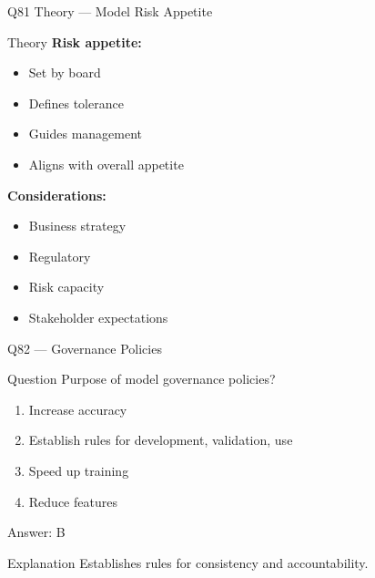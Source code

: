 \documentclass[aspectratio=169,8pt]{beamer}
\begin{document}
	\begin{frame}{Q81 Theory --- Model Risk Appetite}
		\begin{block}{Theory}
			\textbf{Risk appetite:}
			\begin{itemize}
				\item Set by board
				\item Defines tolerance
				\item Guides management
				\item Aligns with overall appetite
			\end{itemize}
			\textbf{Considerations:}
			\begin{itemize}
				\item Business strategy
				\item Regulatory
				\item Risk capacity
				\item Stakeholder expectations
			\end{itemize}
		\end{block}
	\end{frame}
	
	\begin{frame}{Q82 --- Governance Policies}
		\begin{block}{Question}
			Purpose of model governance policies?
		\end{block}
		\begin{enumerate}[label=\Alph*.]
			\item Increase accuracy
			\item Establish rules for development, validation, use
			\item Speed up training
			\item Reduce features
		\end{enumerate}
		\begin{exampleblock}{Answer: B}
		\end{exampleblock}
		\begin{block}{Explanation}
			Establishes rules for consistency and accountability.
		\end{block}
	\end{frame}
	
\end{document}
